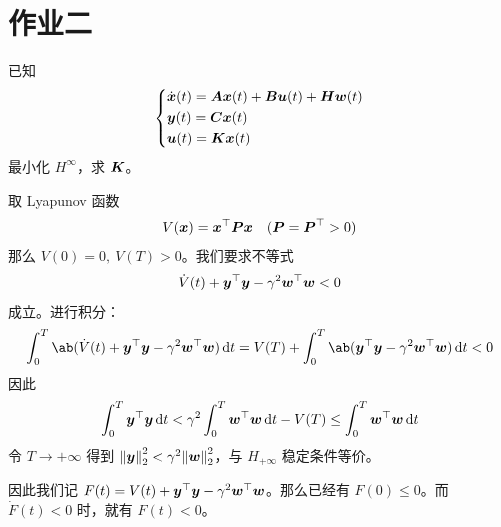 \section{作业二}

\begin{problem}
	已知
	$$
	\begin{dcases}
		\dot{\boldsymbol{x}}(t) = \boldsymbol{A} \boldsymbol{x}(t) + \boldsymbol{B} \boldsymbol{u}(t) + \boldsymbol{H} \boldsymbol{w}(t) \\
		\boldsymbol{y}(t) = \boldsymbol{C} \boldsymbol{x}(t) \\
		\boldsymbol{u}(t) = \boldsymbol{K} \boldsymbol{x}(t) \\
	\end{dcases}
	$$
	最小化 $H^{\infty}$，求 $\boldsymbol{K}$。

	\begin{solution}
		取 Lyapunov	函数
		$$
		V(\boldsymbol{x}) = \boldsymbol{x}^\top \boldsymbol{P} \boldsymbol{x} \quad (\boldsymbol{P} = \boldsymbol{P}^\top > 0)
		$$
		那么 $V(0) = 0,\ V(T) > 0$。我们要求不等式
		$$
		\dot{V}(t) + \boldsymbol{y}^\top \boldsymbol{y} - \gamma^2 \boldsymbol{w}^\top \boldsymbol{w} < 0
		$$
		成立。进行积分：
		$$
		\int_{0}^{T} \ab(\dot{V}(t) + \vect{y}^\top \vect{y} - \gamma^2 \vect{w}^\top \vect{w}) \dd{t} = V(T) + \int_{0}^{T} \ab(\vect{y}^\top \vect{y} - \gamma^2 \vect{w}^\top \vect{w}) \dd{t} < 0
		$$
		因此
		$$
		\int_{0}^{T} \boldsymbol{y}^\top \boldsymbol{y} \dd{t} < \gamma^2 \int_{0}^{T} \boldsymbol{w}^\top \boldsymbol{w} \dd{t} - V(T) \le \int_{0}^{T} \boldsymbol{w}^\top \boldsymbol{w} \dd{t}
		$$
		令 $T \to + \infty$ 得到 $\norm{\boldsymbol{y}}_2^2 < \gamma^2 \norm{\boldsymbol{w}}_2^2$，与 $H_{+ \infty}$ 稳定条件等价。
		
		因此我们记 $F(t) = V(t) + \boldsymbol{y}^\top \boldsymbol{y} - \gamma^2 \boldsymbol{w}^\top \boldsymbol{w}$。那么已经有 $F(0) \le 0$。而 $\dot{F}(t) < 0$ 时，就有 $F(t) < 0$。


\end{solution}
\end{problem}
